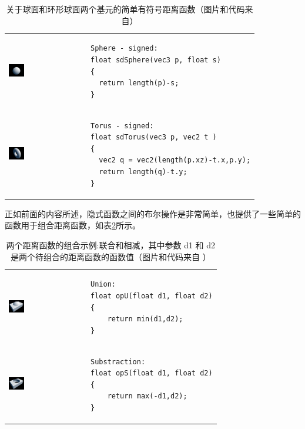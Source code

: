\begin{table}
\begin{tabular}{m{3.0cm}m{}} 
\includegraphics[width=0.21\textwidth]{figures/df/sphere} &
	 \begin{lstlisting}
Sphere - signed:
float sdSphere(vec3 p, float s)
{
  return length(p)-s;
}
\end{lstlisting} \\
   \includegraphics[width=0.21\textwidth]{graphics/df/torus} & 
    \begin{lstlisting}
Torus - signed:
float sdTorus(vec3 p, vec2 t )
{
  vec2 q = vec2(length(p.xz)-t.x,p.y);
  return length(q)-t.y;
}
   \end{lstlisting}
\end{tabular}
\caption{关于球面和环形球面两个基元的简单有符号距离函数（图片和代码来自\cite{w:distance-function}）}
\label{t:df-dist-function-1}
\end{table}

正如前面的内容所述，隐式函数之间的布尔操作是非常简单，\cite{w:distance-function}也提供了一些简单的函数用于组合距离函数，如表\ref{t:df-dist-function-2}所示。

\begin{table}
\begin{tabular}{m{3cm}m{}} 
\includegraphics[width=0.21\textwidth]{graphics/df/union} &
	 \begin{lstlisting}
Union:
float opU(float d1, float d2)
{
    return min(d1,d2);
}
\end{lstlisting} \\
   \includegraphics[width=0.21\textwidth]{graphics/df/substraction} & 
    \begin{lstlisting}
Substraction:
float opS(float d1, float d2)
{
    return max(-d1,d2);
}
   \end{lstlisting}
\end{tabular}
\caption{两个距离函数的组合示例:联合和相减，其中参数 d1 和 d2是两个待组合的距离函数的函数值（图片和代码来自 \cite{w:distance-function}）}
\label{t:df-dist-function-2}
\end{table}

